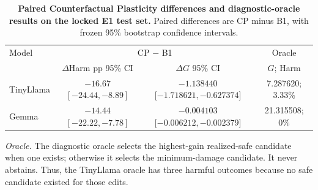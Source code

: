 
\begin{table}[t]
\raggedright
\caption{\textbf{Paired Counterfactual Plasticity differences and diagnostic-oracle results on the locked E1 test set.}
Paired differences are CP minus B1, with frozen 95\% bootstrap confidence intervals.}
\label{tab:e1-primary-differences-oracle}

\small
\begin{threeparttable}
\begin{tabular*}{\textwidth}{@{\extracolsep{\fill}}lccc}
\toprule
Model & \multicolumn{2}{c}{CP $-$ B1} & Oracle \\
\cmidrule(lr){2-3}\cmidrule(l){4-4}
& \shortstack{$\Delta$Harm pp\\[-1pt]95\% CI}
& \shortstack{$\Delta G$\\[-1pt]95\% CI}
& $G$; Harm \\
\midrule
TinyLlama
& \shortstack{$-16.67$\\[-1pt]$[-24.44,-8.89]$}
& \shortstack{$-1.138440$\\[-1pt]$[-1.718621,-0.627374$]}
& 7.287620; 3.33\% \\
Gemma
& \shortstack{$-14.44$\\[-1pt]$[-22.22,-7.78]$}
& \shortstack{$-0.004103$\\[-1pt]$[-0.006212,-0.002379$]}
& 21.315508; 0\% \\
\bottomrule
\end{tabular*}

\begin{tablenotes}[flushleft]\footnotesize
\item \textit{Oracle.} The diagnostic oracle selects the highest-gain realized-safe candidate when one exists; otherwise it selects the minimum-damage candidate. It never abstains. Thus, the TinyLlama oracle has three harmful outcomes because no safe candidate existed for those edits.
\end{tablenotes}
\end{threeparttable}
\end{table}
